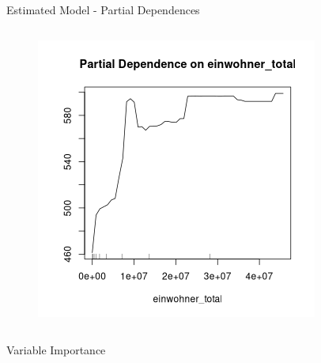 \documentclass[11pt]{beamer}\usepackage[]{graphicx}\usepackage[]{color}
\begin{document}
\begin{frame}{Estimated Model - Partial Dependences}
\begin{columns}[t]
\begin{column}{.5\linewidth}
\begin{figure}
        \includegraphics[width=0.6\linewidth]{Partial_Dependence_einwohner_total.png}
       \end{figure}
\end{column}
\end{columns}
\end{frame}

\begin{frame}{Variable Importance}
\end{frame}
\end{document}
